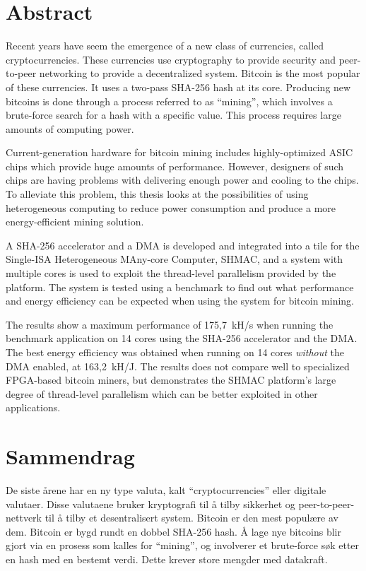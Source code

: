 \chapter*{Abstract}

Recent years have seem the emergence of a new class of currencies, called
cryptocurrencies. These currencies use cryptography to provide security
and peer-to-peer networking to provide a decentralized system. Bitcoin is
the most popular of these currencies. It uses a two-pass
SHA-256 hash at its core. Producing new bitcoins is done through a process
referred to as ``mining'', which involves a brute-force search for a hash with
a specific value. This process requires large amounts of computing power.

Current-generation hardware for bitcoin mining includes highly-optimized
ASIC chips which provide huge amounts of performance. However, designers of
such chips are having problems with delivering enough power and cooling
to the chips. To alleviate this problem, this thesis looks at the possibilities
of using heterogeneous computing to reduce power consumption and produce a more
energy-efficient mining solution.

A SHA-256 accelerator and a DMA is developed and integrated into a tile for
the Single-ISA Heterogeneous MAny-core Computer, SHMAC, and a system with
multiple cores is used to exploit the thread-level parallelism provided by
the platform. The system is tested using a benchmark to find out what performance
and energy efficiency can be expected when using the system for bitcoin mining.

The results show a maximum performance of 175,7~kH/s when running the benchmark
application on 14 cores using the SHA-256 accelerator and the DMA. The best
energy efficiency was obtained when running on 14 cores \emph{without} the DMA enabled,
at 163,2~kH/J. The results does not compare well to specialized FPGA-based
bitcoin miners, but demonstrates the SHMAC platform's large degree of thread-level parallelism
which can be better exploited in other applications.

\chapter*{Sammendrag}

De siste årene har en ny type valuta, kalt ``cryptocurrencies'' eller digitale valutaer. Disse valutaene
bruker kryptografi til å tilby sikkerhet og peer-to-peer-nettverk til å tilby et
desentralisert system. Bitcoin er den mest populære av dem. Bitcoin er bygd rundt
en dobbel SHA-256 hash. Å lage nye bitcoins blir gjort via en prosess som kalles
for ``mining'', og involverer et brute-force søk etter en hash med en bestemt verdi.
Dette krever store mengder med datakraft.

